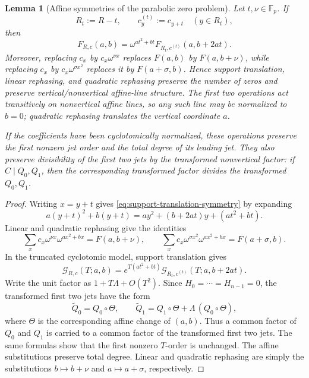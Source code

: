 \documentclass[11pt]{article}
\newtheorem{lemma}[theorem]{Lemma}
\newcommand{\F}{\mathbb F}
\begin{document}
\begin{lemma}[Affine symmetries of the parabolic zero problem]
\label{lem:parabolic-affine-symmetry}
Let \(t,\nu\in\F_p\).  If
\[
 R_t:=R-t,
 \qquad
 c^{(t)}_y:=c_{y+t}\quad(y\in R_t),
\]
then
\begin{equation}
 F_{R,c}(a,b)
 =
 \omega^{at^2+bt}
 F_{R_t,c^{(t)}}(a,b+2at).
 \label{eq:support-translation-symmetry}
\end{equation}
Moreover, replacing \(c_x\) by \(c_x\omega^{\nu x}\) replaces
\(F(a,b)\) by \(F(a,b+\nu)\), while replacing \(c_x\) by
\(c_x\omega^{\sigma x^2}\) replaces it by \(F(a+\sigma,b)\).  Hence support
translation, linear rephasing, and quadratic rephasing preserve the number
of zeros and preserve vertical/nonvertical affine-line structure.  The first
two operations act transitively on nonvertical affine lines, so any such line
may be normalized to \(b=0\); quadratic rephasing translates the vertical
coordinate \(a\).

If the coefficients have been cyclotomically normalized, these operations
preserve the first nonzero jet order and the total degree of its leading jet.
They also preserve divisibility of the first two jets by the transformed
nonvertical factor: if \(C\mid Q_0,Q_1\), then the corresponding transformed
factor divides the transformed \(Q_0,Q_1\).
\end{lemma}

\begin{proof}
Writing \(x=y+t\) gives \eqref{eq:support-translation-symmetry} by
expanding
\[
 a(y+t)^2+b(y+t)
 =ay^2+(b+2at)y+(at^2+bt).
\]
Linear and quadratic rephasing give the identities
\[
 \sum_x c_x\omega^{\nu x}\omega^{ax^2+bx}=F(a,b+\nu),
 \qquad
 \sum_x c_x\omega^{\sigma x^2}\omega^{ax^2+bx}=F(a+\sigma,b).
\]
In the truncated cyclotomic model, support translation gives
\[
 \mathcal G_{R,c}(T;a,b)
 =e^{T(at^2+bt)}
  \mathcal G_{R_t,c^{(t)}}(T;a,b+2at).
\]
Write the unit factor as \(1+T\Lambda+O(T^2)\).  Since
\(H_0=\cdots=H_{n-1}=0\), the transformed first two jets have the form
\[
 \widetilde Q_0=Q_0\circ\Theta,
 \qquad
 \widetilde Q_1=Q_1\circ\Theta+\Lambda\,(Q_0\circ\Theta),
\]
where \(\Theta\) is the corresponding affine change of \((a,b)\).  Thus a
common factor of \(Q_0\) and \(Q_1\) is carried to a common factor of the
transformed first two jets.  The same formulas show that the first nonzero
\(T\)-order is unchanged.  The affine substitutions preserve total degree.
Linear and quadratic rephasing are simply the substitutions
\(b\mapsto b+\nu\) and \(a\mapsto a+\sigma\), respectively.
\end{proof}
\end{document}
